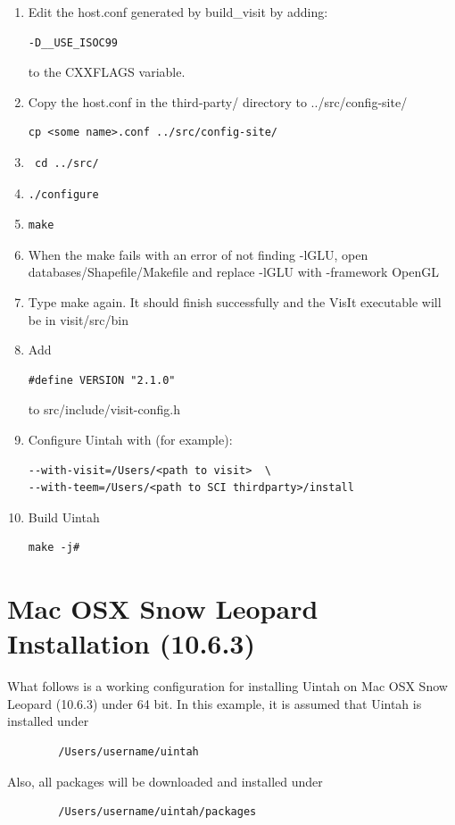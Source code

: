 \documentclass[12pt]{article}
\begin{document}
\begin{enumerate}
\begin{verbatim}
\end{verbatim}
\item Edit the host.conf generated by build\_visit by adding: 
\begin{verbatim}
-D__USE_ISOC99
\end{verbatim} 
 to the CXXFLAGS variable. 
\item Copy the host.conf in the third-party/ directory to ../src/config-site/ 
\begin{verbatim}
cp <some name>.conf ../src/config-site/
\end{verbatim}
\item \begin{verbatim} cd ../src/ \end{verbatim}
\item \begin{verbatim}./configure \end{verbatim} 
\item \begin{verbatim}make \end{verbatim}
\item When the make fails with an error of not finding -lGLU, open databases/Shapefile/Makefile and replace -lGLU with -framework OpenGL
\item Type make again. It should finish successfully and the VisIt executable will be in visit/src/bin
\item Add 
\begin{verbatim}
#define VERSION "2.1.0"
\end{verbatim}  
to src/include/visit-config.h
\item Configure Uintah with (for example): 
\begin{verbatim}
--with-visit=/Users/<path to visit>  \ 
--with-teem=/Users/<path to SCI thirdparty>/install
\end{verbatim}
\item Build Uintah
\begin{verbatim}
make -j# 
\end{verbatim}
\end{enumerate}  
\section{Mac OSX Snow Leopard Installation (10.6.3)}
	What follows is a working configuration for installing Uintah on Mac OSX Snow Leopard (10.6.3) under 64 bit. In this example, it is assumed that Uintah is installed under
	\begin{verbatim}
		/Users/username/uintah
	\end{verbatim}
	Also, all packages will be downloaded and installed under 
	\begin{verbatim}
		/Users/username/uintah/packages
	\end{verbatim}
\end{document}
